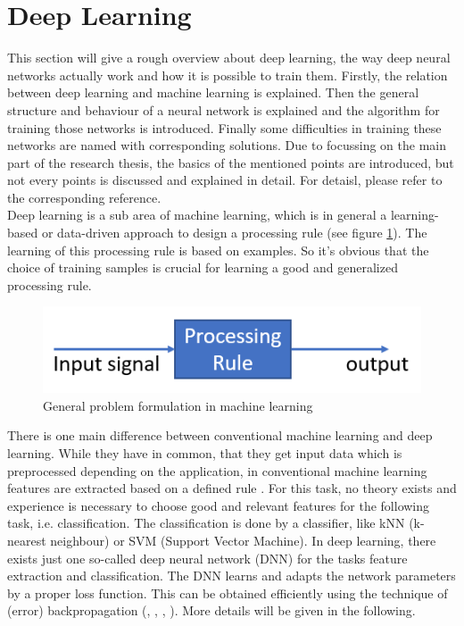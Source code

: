 \documentclass[12pt,DIV14,BCOR12mm,a4paper,footexclude,headinclude,halfparskip-,twoside,openright,cleardoubleempty,idxtotoc,bibtotoc,listtotoc]{scrreprt} %
\numberwithin{equation}{chapter}
\begin{document}
\section{Deep Learning}
This section will give a rough overview about deep learning, the way deep neural networks actually work and how it is possible to train them. Firstly, the relation between deep learning and machine learning is explained. Then the general structure and behaviour of a neural network is explained and the algorithm for training those networks is introduced. Finally some difficulties in training these networks are named with corresponding solutions. Due to focussing on the main part of the research thesis, the basics of the mentioned points are introduced, but not every points is discussed and explained in detail. For detaisl, please refer to the corresponding reference.\\
Deep learning is a sub area of machine learning, which is in general a learning-based or data-driven approach to design a processing rule (see figure \ref{fig:ProcessingRule}). The learning of this processing rule is based on examples. So it's obvious that the choice of training samples is crucial for learning a good and generalized processing rule. 
\begin{figure}[htb!]
	\centering
	\includegraphics[width=0.5\linewidth]{Graphiken/ProcessingRule}
	\caption{General problem formulation in machine learning}
	\label{fig:ProcessingRule}
\end{figure}
There is one main difference between conventional machine learning and deep learning. While they have in common, that they get input data which is preprocessed depending on the application, in conventional machine learning features are extracted based on a defined rule \cite{Goodfellow-et-al-2016}. For this task, no theory exists and experience is necessary to choose good and relevant features for the following task, i.e. classification. The classification is done by a classifier, like kNN (k-nearest neighbour) or SVM (Support Vector Machine). In deep learning, there exists just one so-called deep neural network (DNN) for the tasks feature extraction and classification. The DNN learns and adapts the network parameters by a proper loss function. This can be obtained efficiently using the technique of (error) backpropagation (\cite{Goodfellow-et-al-2016}, \cite{Nielsen-Michael}, \cite{DeepLearningDive}, \cite{Bishop}). More details will be given in the following.\\
\end{document}
